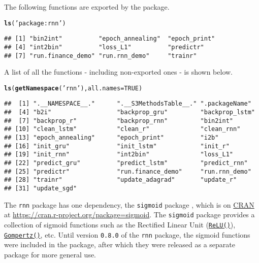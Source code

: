 \documentclass[english,article]{article}\usepackage[]{graphicx}\usepackage[]{color}
\makeatletter
\newcommand{\hlnum}[1]{\textcolor[rgb]{0.686,0.059,0.569}{#1}}%
\newcommand{\hlstr}[1]{\textcolor[rgb]{0.192,0.494,0.8}{#1}}%
\newcommand{\hlstd}[1]{\textcolor[rgb]{0.345,0.345,0.345}{#1}}%
\newcommand{\hlkwc}[1]{\textcolor[rgb]{0.333,0.667,0.333}{#1}}%
\newcommand{\hlkwd}[1]{\textcolor[rgb]{0.737,0.353,0.396}{\textbf{#1}}}%
\newenvironment{kframe}{%
 \def\at@end@of@kframe{}%
 \ifinner\ifhmode%
  \def\at@end@of@kframe{\end{minipage}}%
  \begin{minipage}{\columnwidth}%
 \fi\fi%
 \def\FrameCommand##1{\hskip\@totalleftmargin \hskip-\fboxsep
 \colorbox{shadecolor}{##1}\hskip-\fboxsep
     \hskip-\linewidth \hskip-\@totalleftmargin \hskip\columnwidth}%
 \MakeFramed {\advance\hsize-\width
   \@totalleftmargin\z@ \linewidth\hsize
   \@setminipage}}%
 {\par\unskip\endMakeFramed%
 \at@end@of@kframe}
\newenvironment{knitrout}{}{} %
\providecommand*{\code}[1]{\texttt{#1}}
\makeatother
\begin{document}
The following functions are exported by the package.

\begin{knitrout}
\color{fgcolor}\begin{kframe}
\begin{alltt}
\hlkwd{ls}\hlstd{(}\hlstr{'package:rnn'}\hlstd{)}
\end{alltt}
\begin{verbatim}
## [1] "bin2int"          "epoch_annealing"  "epoch_print"     
## [4] "int2bin"          "loss_L1"          "predictr"        
## [7] "run.finance_demo" "run.rnn_demo"     "trainr"
\end{verbatim}
\end{kframe}
\end{knitrout}

A list of all the functions - including non-exported ones - is shown
below.

\begin{knitrout}
\color{fgcolor}\begin{kframe}
\begin{alltt}
\hlkwd{ls}\hlstd{(}\hlkwd{getNamespace}\hlstd{(}\hlstr{'rnn'}\hlstd{),} \hlkwc{all.names}\hlstd{=}\hlnum{TRUE}\hlstd{)}
\end{alltt}
\begin{verbatim}
##  [1] ".__NAMESPACE__."      ".__S3MethodsTable__." ".packageName"        
##  [4] "b2i"                  "backprop_gru"         "backprop_lstm"       
##  [7] "backprop_r"           "backprop_rnn"         "bin2int"             
## [10] "clean_lstm"           "clean_r"              "clean_rnn"           
## [13] "epoch_annealing"      "epoch_print"          "i2b"                 
## [16] "init_gru"             "init_lstm"            "init_r"              
## [19] "init_rnn"             "int2bin"              "loss_L1"             
## [22] "predict_gru"          "predict_lstm"         "predict_rnn"         
## [25] "predictr"             "run.finance_demo"     "run.rnn_demo"        
## [28] "trainr"               "update_adagrad"       "update_r"            
## [31] "update_sgd"
\end{verbatim}
\end{kframe}
\end{knitrout}

The \code{rnn} package has one dependency, the \code{sigmoid} package
\citep{quast2016sigmoid}, which is on \href{https://cran.r-project.org/}{CRAN}
at \href{https://cran.r-project.org/package\%3Dsigmoid}{https://cran.r-project.org/package=sigmoid}.
The \code{sigmoid} package provides a collection of sigmoid functions
such as the Rectified Linear Unit (\code{\href{https://cran.r-project.org/web/packages/sigmoid/vignettes/sigmoid.html\#relu}{ReLU()}}),
\code{\href{https://cran.r-project.org/web/packages/sigmoid/vignettes/sigmoid.html\#gompertz}{Gompertz()}},
etc. Until version \code{0.8.0} of the \code{rnn} package, the sigmoid
functions were included in the package, after which they were released
as a separate package for more general use.
\end{document}
